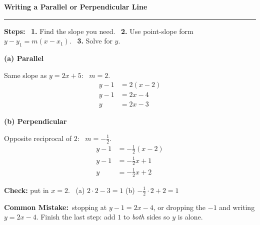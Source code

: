 \documentclass[11pt,letterpaper]{article}
\newcommand{\cardtitle}[1]{{\large\bfseries\color{fmkey}#1}\par\vspace{1mm}
  {\color{fmkey}\rule{\linewidth}{0.8pt}}\par\vspace{2mm}}
\newcommand{\mistake}[1]{{\color{fmmistake}\bfseries Common Mistake:}\ #1}
\begin{document}
\begin{tcolorbox}[enhanced, width=\linewidth, height=11.4cm,
  colback=white, colframe=fmkey, boxrule=1.6pt, arc=4mm,
  valign=top, left=6mm, right=6mm, top=4mm,
  overlay={\node[anchor=south east, font=\scriptsize, text=fmgray]
     at ([xshift=-5mm,yshift=3mm]frame.south east) {Card 2 \textperiodcentered\ Answer};}]
\cardtitle{Writing a Parallel or Perpendicular Line}
{\small\textbf{Steps:} \ \textbf{1.} Find the slope you need. \ \textbf{2.} Use point-slope form $y - y_1 = m(x - x_1)$. \ \textbf{3.} Solve for $y$.}\par\vspace{3mm}
\begin{minipage}[t]{0.48\linewidth}
{\color{fmwatch}\bfseries (a) Parallel}\par\vspace{1mm}
{\small Same slope as $y=2x+5$: \ $m = 2$.}
\begin{align*}
y - 1 &= 2(x - 2)\\
y - 1 &= 2x - 4\\
y &= 2x - 3
\end{align*}
\end{minipage}\hfill
\begin{minipage}[t]{0.48\linewidth}
{\color{fmwatch}\bfseries (b) Perpendicular}\par\vspace{1mm}
{\small Opposite reciprocal of $2$: \ $m = -\tfrac12$.}
\begin{align*}
y - 1 &= -\tfrac12(x - 2)\\
y - 1 &= -\tfrac12 x + 1\\
y &= -\tfrac12 x + 2
\end{align*}
\end{minipage}\par\vspace{2mm}
{\small\textbf{Check:} put in $x = 2$. \ (a) $2 \cdot 2 - 3 = 1$ \checkmark \qquad (b) $-\tfrac12 \cdot 2 + 2 = 1$ \checkmark}\par\vspace{3mm}
{\small\mistake{stopping at $y - 1 = 2x - 4$, or dropping the $-1$ and writing $y = 2x - 4$. Finish the last step: add $1$ to \emph{both} sides so $y$ is alone.}}
\end{tcolorbox}
\end{document}
